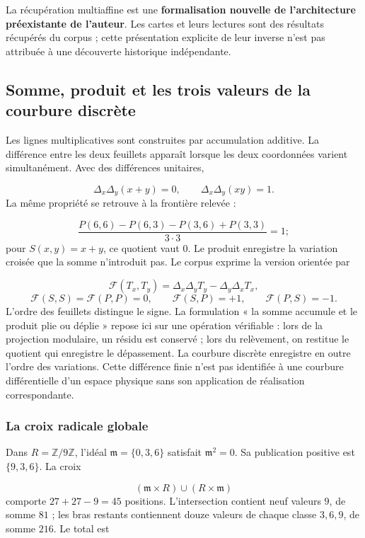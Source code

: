 La récupération multiaffine est une \textbf{formalisation nouvelle de l'architecture préexistante de l'auteur}. Les cartes et leurs lectures sont des résultats récupérés du corpus ; cette présentation explicite de leur inverse n'est pas attribuée à une découverte historique indépendante.

\subsection{Somme, produit et les trois valeurs de la courbure discrète}
Les lignes multiplicatives sont construites par accumulation additive. La différence entre les deux feuillets apparaît lorsque les deux coordonnées varient simultanément. Avec des différences unitaires,

\[
\Delta_x\Delta_y(x+y)=0,
\qquad
\Delta_x\Delta_y(xy)=1.
\]
La même propriété se retrouve à la frontière relevée :

\[
\frac{P(6,6)-P(6,3)-P(3,6)+P(3,3)}{3\cdot3}=1;
\]
pour \(S(x,y)=x+y\), ce quotient vaut \(0\). Le produit enregistre la variation croisée que la somme n'introduit pas. Le corpus exprime la version orientée par

\[
\mathcal F(T_x,T_y)=\Delta_x\Delta_yT_y-\Delta_y\Delta_xT_x,
\]
\[
\mathcal F(S,S)=\mathcal F(P,P)=0,
\qquad \mathcal F(S,P)=+1,
\qquad \mathcal F(P,S)=-1.
\]
L'ordre des feuillets distingue le signe. La formulation « la somme accumule et le produit plie ou déplie » repose ici sur une opération vérifiable : lors de la projection modulaire, un résidu est conservé ; lors du relèvement, on restitue le quotient qui enregistre le dépassement. La courbure discrète enregistre en outre l'ordre des variations. Cette différence finie n'est pas identifiée à une courbure différentielle d'un espace physique sans son application de réalisation correspondante.

\subsubsection*{La croix radicale globale}
Dans \(R=\mathbb Z/9\mathbb Z\), l'idéal \(\mathfrak m=\{0,3,6\}\) satisfait \(\mathfrak m^2=0\). Sa publication positive est \(\{9,3,6\}\). La croix

\[
(\mathfrak m\times R)\cup(R\times\mathfrak m)
\]
comporte \(27+27-9=45\) positions. L'intersection contient neuf valeurs \(9\), de somme \(81\) ; les bras restants contiennent douze valeurs de chaque classe \(3,6,9\), de somme \(216\). Le total est


